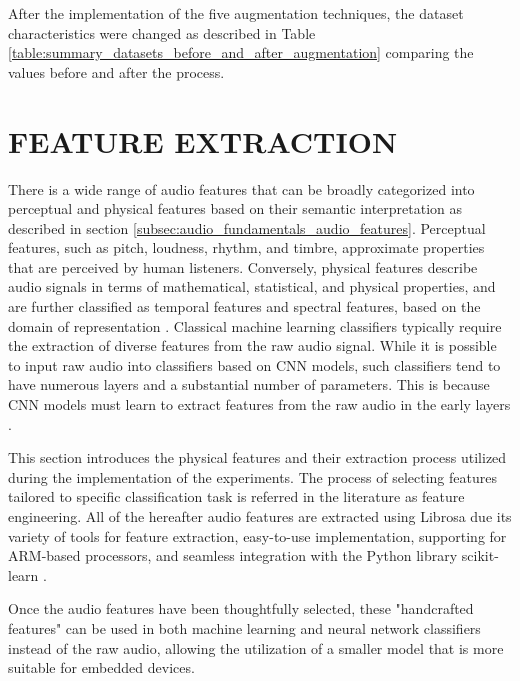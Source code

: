 After the implementation of the five augmentation techniques, the dataset characteristics were changed as described in Table \ref{table:summary_datasets_before_and_after_augmentation} comparing the values before and after the process.

\section{FEATURE EXTRACTION}
\label{sec:methods_feature_extraction}

There is a wide range of audio features that can be broadly categorized into perceptual and physical features based on their semantic interpretation as described in section \ref{subsec:audio_fundamentals_audio_features}. Perceptual features, such as pitch, loudness, rhythm, and timbre, approximate properties that are perceived by human listeners. Conversely, physical features describe audio signals in terms of mathematical, statistical, and physical properties, and are further classified as temporal features and spectral features, based on the domain of representation \cite{Lhoest2021}. Classical machine learning classifiers typically require the extraction of diverse features from the raw audio signal. While it is possible to input raw audio into classifiers based on CNN models, such classifiers tend to have numerous layers and a substantial number of parameters. This is because CNN models must learn to extract features from the raw audio in the early layers \cite{Chu2023}.

This section introduces the physical features and their extraction process utilized during the implementation of the experiments. The process of selecting features tailored to specific classification task is referred in the literature as feature engineering. All of the hereafter audio features are extracted using Librosa \cite{McFee2015librosa_sw} due its variety of tools for feature extraction, easy-to-use implementation, supporting for ARM-based processors, and seamless integration with the Python library scikit-learn \cite{scikitle61}.

Once the audio features have been thoughtfully selected, these "handcrafted features" can be used in both machine learning and neural network classifiers instead of the raw audio, allowing the utilization of a smaller model that is more suitable for embedded devices.

